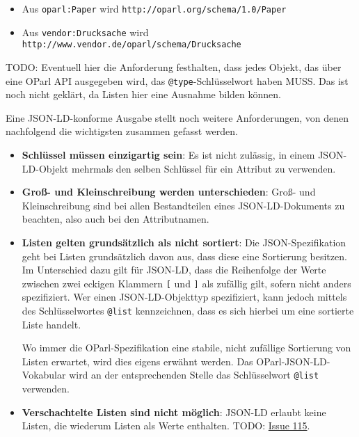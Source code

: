 \documentclass[,a4paper]{article}
\begin{document}
\begin{itemize}
\itemsep1pt\parskip0pt
\item
  Aus \texttt{oparl:Paper} wird
  \texttt{http://oparl.org/schema/1.0/Paper}
\item
  Aus \texttt{vendor:Drucksache} wird
  \texttt{http://www.vendor.de/oparl/schema/Drucksache}
\end{itemize}

TODO: Eventuell hier die Anforderung festhalten, dass jedes Objekt, das
über eine OParl API ausgegeben wird, das \texttt{@type}-Schlüsselwort
haben MUSS. Das ist noch nicht geklärt, da Listen hier eine Ausnahme
bilden können.

Eine JSON-LD-konforme Ausgabe stellt noch weitere Anforderungen, von
denen nachfolgend die wichtigsten zusammen gefasst werden.

\begin{itemize}
\item
  \textbf{Schlüssel müssen einzigartig sein}: Es ist nicht zulässig, in
  einem JSON-LD-Objekt mehrmals den selben Schlüssel für ein Attribut zu
  verwenden.
\item
  \textbf{Groß- und Kleinschreibung werden unterschieden}: Groß- und
  Kleinschreibung sind bei allen Bestandteilen eines JSON-LD-Dokuments
  zu beachten, also auch bei den Attributnamen.
\item
  \textbf{Listen gelten grundsätzlich als nicht sortiert}: Die
  JSON-Spezifikation geht bei Listen grundsätzlich davon aus, dass diese
  eine Sortierung besitzen. Im Unterschied dazu gilt für JSON-LD, dass
  die Reihenfolge der Werte zwischen zwei eckigen Klammern \texttt{{[}}
  und \texttt{{]}} als zufällig gilt, sofern nicht anders spezifiziert.
  Wer einen JSON-LD-Objekttyp spezifiziert, kann jedoch mittels des
  Schlüsselwortes \texttt{@list} kennzeichnen, dass es sich hierbei um
  eine sortierte Liste handelt.

  Wo immer die OParl-Spezifikation eine stabile, nicht zufällige
  Sortierung von Listen erwartet, wird dies eigens erwähnt werden. Das
  OParl-JSON-LD-Vokabular wird an der entsprechenden Stelle das
  Schlüsselwort \texttt{@list} verwenden.
\item
  \textbf{Verschachtelte Listen sind nicht möglich}: JSON-LD erlaubt
  keine Listen, die wiederum Listen als Werte enthalten. TODO:
  \href{https://github.com/OParl/specs/issues/115}{Issue 115}.
\end{itemize}

\end{document}
